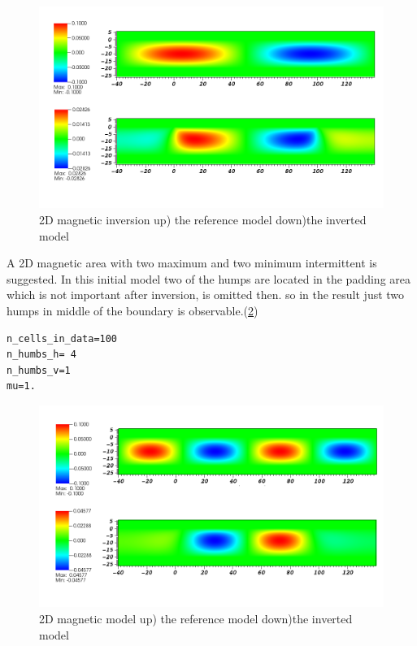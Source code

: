\begin{figure}
\centering
\includegraphics[width=\textwidth]{mag2D2.png}
\caption{2D magnetic inversion up) the reference model  down)the inverted model}
\label{fig:mag2D2}
\end{figure}

\item A 2D magnetic area with two maximum and two minimum intermittent is suggested. In this initial model two of the humps are located in the padding area which is not important after inversion, is omitted then. so in the result just two humps in middle of the boundary is observable.(\ref{fig:mag2D4})

\begin{verbatim}
n_cells_in_data=100
n_humbs_h= 4
n_humbs_v=1
mu=1.
\end{verbatim}

\begin{figure}
\centering
\includegraphics[width=\textwidth]{mag2D4.png}
\caption{2D magnetic model up) the reference model  down)the inverted model}
\label{fig:mag2D4}
\end{figure}

